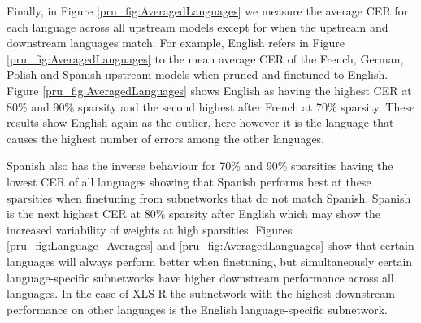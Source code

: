 Finally, in Figure \ref{pru_fig:AveragedLanguages} we measure the average CER for each language across all upstream models except for when the upstream and downstream languages match. For example, English refers in Figure \ref{pru_fig:AveragedLanguages} to the mean average CER of the French, German, Polish and Spanish upstream models when pruned and finetuned to English. Figure \ref{pru_fig:AveragedLanguages} shows English as having the highest CER at 80\% and 90\% sparsity and the second highest after French at 70\% sparsity. These results show English again as the outlier, here however it is the language that causes the highest number of errors among the other languages. 

Spanish also has the inverse behaviour for 70\% and 90\% sparsities having the lowest CER of all languages showing that Spanish performs best at these sparsities when finetuning from subnetworks that do not match Spanish. Spanish is the next highest CER at 80\% sparsity after English which may show the increased variability of weights at high sparsities. Figures \ref{pru_fig:Language_Averages} and \ref{pru_fig:AveragedLanguages} show that  certain languages will always perform better when finetuning, but simultaneously certain language-specific subnetworks have higher downstream performance across all languages. In the case of XLS-R the subnetwork with the highest downstream performance on other languages is the English language-specific subnetwork.

